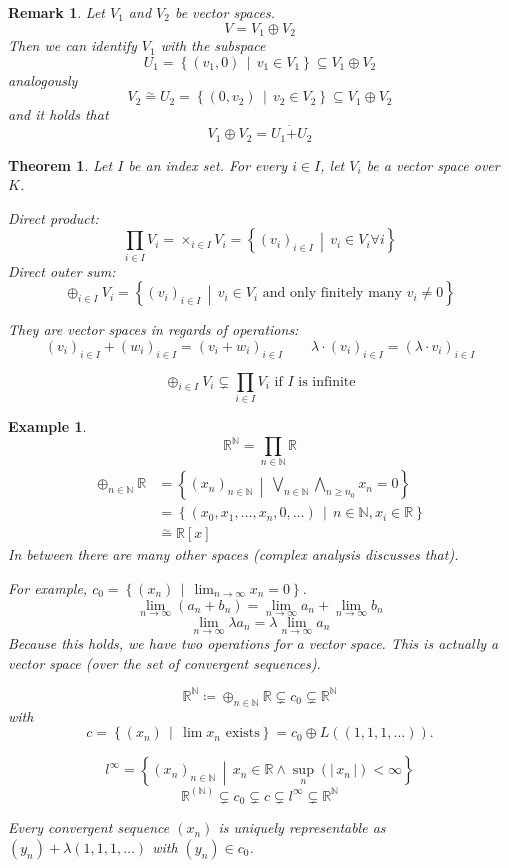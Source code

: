 \documentclass[a4paper,landscape,twocolumn]{article}
\newcommand\abs[1]{|\,#1\,|}
\newcommand\setdef[2]{\left\{#1\,\middle|\,#2\right\}}
\newtheorem{theorem}{Theorem}[section]
\newtheorem{ex}{Example}[section]
\newtheorem{rem}{Remark}[section]
\begin{document}
\begin{rem}
  Let $V_1$ and $V_2$ be vector spaces.
  \[ V = V_1 \oplus V_2 \]
  Then we can identify $V_1$ with the subspace
  \[ U_1 = \setdef{(v_1, 0)}{v_1 \in V_1} \subseteq V_1 \oplus V_2 \]
  analogously
  \[ V_2 \stackrel\sim{=} U_2 = \setdef{(0, v_2)}{v_2 \in V_2} \subseteq V_1 \oplus V_2 \]
  and it holds that
  \[ V_1 \oplus V_2 = U_1 \dot{+} U_2 \]
\end{rem}

\begin{theorem}
  Let $I$ be an index set.
  For every $i \in I$, let $V_i$ be a vector space over $K$.

  Direct product:
  \[ \prod_{i \in I} V_i = \times_{i \in I} V_i = \setdef{(v_i)_{i \in I}}{v_i \in V_i \forall i} \]
  Direct outer sum:
  \[ \oplus_{i \in I} V_i = \setdef{(v_i)_{i \in I}}{v_i \in V_i \text{ and only finitely many } v_i \neq 0} \]

  They are vector spaces in regards of operations:
  \[ (v_i)_{i \in I} + (w_i)_{i \in I} = (v_i + w_i)_{i \in I} \qquad \lambda \cdot (v_i)_{i \in I} = (\lambda \cdot v_i)_{i \in I} \]

  \[ \oplus_{i \in I} V_i \subsetneq \prod_{i \in I} V_i \text{ if $I$ is infinite} \]
\end{theorem}

\begin{ex}
  \[ \mathbb R^{\mathbb N} = \prod_{n \in \mathbb N} \mathbb R \]
  \begin{align*}
    \oplus_{n \in \mathbb N} \mathbb R
      &= \setdef{(x_n)_{n \in \mathbb N}}{\bigvee_{n \in \mathbb N} \bigwedge_{n \geq n_0} x_n = 0} \\
      &= \setdef{(x_0, x_1, \dots, x_n, 0, \dots)}{n \in \mathbb N, x_i \in \mathbb R} \\
      &\stackrel{\sim}= \mathbb R[x]
  \end{align*}
  In between there are \emph{many} other spaces (complex analysis discusses that).

  For example, $c_0 = \setdef{(x_n)}{\lim_{n \to \infty} x_n = 0}$.
  \[ \lim_{n \to \infty} (a_n + b_n) = \lim_{n\to\infty} a_n + \lim_{n\to\infty} b_n \]
  \[ \lim_{n \to \infty} \lambda a_n = \lambda \lim_{n\to\infty} a_n \]
  Because this holds, we have two operations for a vector space. This is actually a vector space (over the set of convergent sequences).

  \[ \mathbb R^{\mathbb N} \coloneqq \oplus_{n \in \mathbb N} \mathbb R \subsetneq c_0 \subsetneq \mathbb R^{\mathbb N} \]
  with
  \[ c = \setdef{(x_n)}{\lim x_n \text{ exists}} = c_0 \oplus L((1, 1, 1, \dots)). \]

  \[ l^\infty = \setdef{(x_n)_{n \in \mathbb N}}{x_n \in \mathbb R \land \sup_n(\abs{x_n}) < \infty} \]
  \[ \mathbb R^{(\mathbb N)} \subsetneq c_0 \subsetneq c \subsetneq l^\infty \subsetneq \mathbb R^{\mathbb N} \]

  Every convergent sequence $(x_n)$ is uniquely representable as $(y_n) + \lambda(1, 1, 1, \dots)$ with $(y_n) \in c_0$.
\end{ex}
\end{document}
